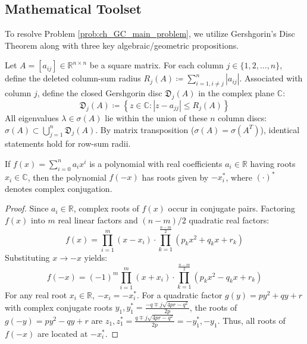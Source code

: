 \subsection{Mathematical Toolset}
To resolve Problem \ref{prob:ch_GC_main_problem}, we utilize Gershgorin's Disc Theorem along with three key algebraic/geometric propositions.
\begin{theo}\label{thm:ch_GC_GershgorinDiscTheorem}
Let $A = [a_{ij}] \in \mathbb{R}^{n \times n}$ be a square matrix. For each column $j \in \{1, 2, \dots, n\}$, define the deleted column-sum radius $R_j(A) \coloneqq \sum_{i=1, i \neq j}^{n} |a_{ij}|$. Associated with column $j$, define the closed Gershgorin disc $\mathfrak{D}_j(A)$ in the complex plane $\mathbb{C}$:
\begin{equation}
	\mathfrak{D}_j(A) \coloneqq \left\{ z \in \mathbb{C} : |z - a_{jj}| \le R_j(A) \right\}
\end{equation}
All eigenvalues $\lambda \in \sigma(A)$ lie within the union of these $n$ column discs: $\sigma(A) \subset \bigcup_{j=1}^{n} \mathfrak{D}_j(A)$. By matrix transposition ($\sigma(A) = \sigma(A^T)$), identical statements hold for row-sum radii.
\end{theo}
\begin{proposition}\label{prop:ch_GC_polynomialreflection}
If $f(x) = \sum_{i=0}^{n} a_i x^i$ is a polynomial with real coefficients $a_i \in \mathbb{R}$ having roots $x_i \in \mathbb{C}$, then the polynomial $f(-x)$ has roots given by $-x_i^*$, where $(\cdot)^*$ denotes complex conjugation.
\end{proposition}
\begin{proof}
Since $a_i \in \mathbb{R}$, complex roots of $f(x)$ occur in conjugate pairs. Factoring $f(x)$ into $m$ real linear factors and $(n-m)/2$ quadratic real factors:
\begin{equation}\label{eq:f_pos}
	f(x) = \prod_{i=1}^{m} (x - x_i) \cdot \prod_{k=1}^{\frac{n-m}{2}} (p_k x^2 + q_k x + r_k)
\end{equation}
Substituting $x \to -x$ yields:
\begin{equation}\label{eq:f_neg}
	f(-x) = (-1)^m \prod_{i=1}^{m} (x + x_i) \cdot \prod_{k=1}^{\frac{n-m}{2}} (p_k x^2 - q_k x + r_k)
\end{equation}
For any real root $x_i \in \mathbb{R}$, $-x_i = -x_i^*$. For a quadratic factor $g(y) = p y^2 + q y + r$ with complex conjugate roots $y_1, y_1^* = \frac{-q \mp j \sqrt{4pr - q^2}}{2p}$, the roots of $g(-y) = p y^2 - q y + r$ are $z_1, z_1^* = \frac{q \mp j \sqrt{4pr - q^2}}{2p} = -y_1^*, -y_1$. Thus, all roots of $f(-x)$ are located at $-x_i^*$.
\end{proof}

